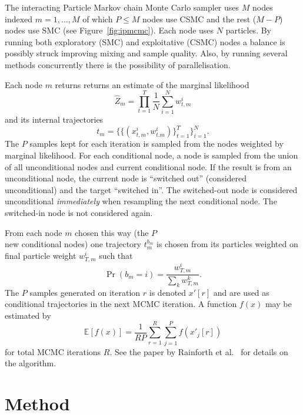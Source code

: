 The interacting Particle Markov chain Monte Carlo sampler uses $M$ nodes indexed $m = 1,\dots,M$ of which $P \leq M$ nodes use CSMC and the rest ($M-P$) nodes use SMC (see Figure~\ref{fig:ipmcmc}). Each node uses $N$ particles. By running both exploratory (SMC) and exploitative (CSMC) nodes a balance is possibly struck improving mixing and sample quality. Also, by running several methods concurrently there is the possibility of parallelisation.

Each node $m$ returns returns an estimate of the marginal likelihood
\begin{equation}
    \label{eq:zm}
    \hat Z_m = \prod\limits_{t=1}^T \frac 1 N \sum\limits_{i=1}^N w_{t,m}^i
\end{equation} and its internal trajectories
\begin{equation}
t_m = \{\{(x^i_{t,m},w^i_{t.m})\}_{t=1}^T\}_{i=1}^N .
\end{equation}
The $P$ samples kept for each iteration is sampled from the nodes weighted by marginal likelihood. For each conditional node, a node is sampled from the union of all unconditional nodes and current conditional node. If the result is from an unconditional node, the current node is ``switched out'' (considered unconditional) and the target ``switched in''. The switched-out node is considered unconditional \emph{immediately} when resampling the next conditional node. The switched-in node is not considered again.

From each node $m$ chosen this way (the $P$\\ new conditional nodes) one trajectory $t_m^{b_m}$ is chosen from its particles weighted on final particle weight $w_{T,m}^i$ such that
\begin{equation}
    \label{eq:ipmcmc-mcmc}
    \Pr(b_m = i) = \frac{w_{T,m}^i}{\sum_k w_{T,m}^k}.
\end{equation}
The $P$ samples generated on iteration $r$ is denoted $x'[r]$ and are used as conditional trajectories in the next MCMC iteration. A function $f(x)$ may be estimated by
\begin{equation}
    \mathbb{E}[f(x)] = \frac 1 {RP} \sum\limits_{r=1}^R \sum\limits_{j=1}^P f(x'_j[r]) 
\end{equation}
for total MCMC iterations $R$. See the paper by Rainforth et al.~\cite{ipmcmc} for details on the algorithm.

\section{Method}

